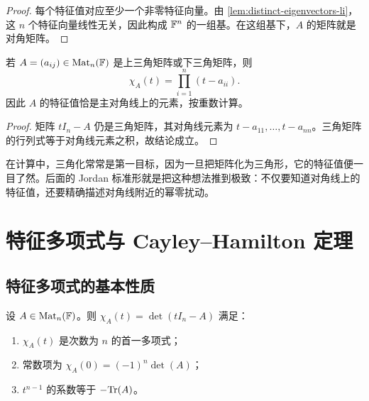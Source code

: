\begin{proof}
每个特征值对应至少一个非零特征向量。由 \cref{lem:distinct-eigenvectors-li}，这 \(n\) 个特征向量线性无关，因此构成 \(\mathbb{F}^n\) 的一组基。在这组基下，\(A\) 的矩阵就是对角矩阵。
\end{proof}

\begin{proposition}
若 \(A=(a_{ij})\in \mathrm{Mat}_n(\mathbb{F})\) 是上三角矩阵或下三角矩阵，则
\[
\chi_A(t)=\prod_{i=1}^n(t-a_{ii}).
\]
因此 \(A\) 的特征值恰是主对角线上的元素，按重数计算。
\end{proposition}

\begin{proof}
矩阵 \(tI_n-A\) 仍是三角矩阵，其对角线元素为 \(t-a_{11},\dots,t-a_{nn}\)。三角矩阵的行列式等于对角线元素之积，故结论成立。
\end{proof}

\begin{remark}
在计算中，三角化常常是第一目标，因为一旦把矩阵化为三角形，它的特征值便一目了然。后面的 Jordan 标准形就是把这种想法推到极致：不仅要知道对角线上的特征值，还要精确描述对角线附近的幂零扰动。
\end{remark}

\section{特征多项式与 Cayley--Hamilton 定理}\label{sec:charpoly-CH}

\subsection{特征多项式的基本性质}

\begin{proposition}\label{prop:charpoly-basic}
设 \(A\in \mathrm{Mat}_n(\mathbb{F})\)。则 \(\chi_A(t)=\det(tI_n-A)\) 满足：
\begin{enumerate}[label=(\arabic*), leftmargin=2.4em]
  \item \(\chi_A(t)\) 是次数为 \(n\) 的首一多项式；
  \item 常数项为 \(\chi_A(0)=(-1)^n\det(A)\)；
  \item \(t^{n-1}\) 的系数等于 \(-\mathrm{Tr}(A)\)。
\end{enumerate}
\end{proposition}

